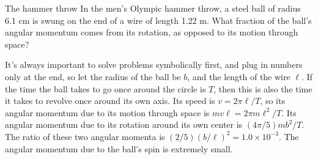 \begin{eg}{The hammer throw}
\egquestion In the men's Olympic hammer throw, a steel ball of radius 6.1 cm is swung on the
end of a wire of length 1.22 m. What fraction of the ball's angular momentum
comes from its rotation, as opposed to its motion through space?

\eganswer It's always important to solve problems symbolically first, and plug in numbers
only at the end, so let the radius of the ball be $b$, and the length of the wire $\ell$.
If the time the ball takes to go once around the circle is $T$, then
this is also the time it takes to revolve once around its own axis. Its speed
is $v=2\pi\ell/T$, so its angular momentum due to its motion through space
is $mv\ell=2\pi m\ell^2/T$. Its angular momentum due to its rotation around its
own center is $(4\pi/5)mb^2/T$. The ratio of these two angular momenta is
$(2/5)(b/\ell)^2=1.0\times10^{-3}$. The angular momentum due to the ball's
spin is extremely small.
\end{eg}
